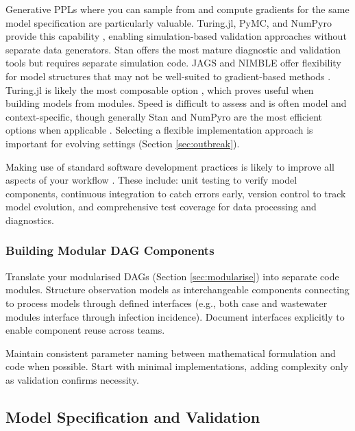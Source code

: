 \documentclass{article}
\begin{document}
Generative PPLs where you can sample from and compute gradients for the same model specification are particularly valuable.
Turing.jl, PyMC, and NumPyro provide this capability \citep{ge2018turing,fjelde2025turing,abril2023pymc,phan2019composable}, enabling simulation-based validation approaches without separate data generators.
Stan offers the most mature diagnostic and validation tools \citep{carpenter2017stan} but requires separate simulation code.
JAGS and NIMBLE offer flexibility for model structures that may not be well-suited to gradient-based methods \citep{plummer2003jags,valpine2017programming}.
Turing.jl is likely the most composable option \citep{ge2018turing}, which proves useful when building models from modules.
Speed is difficult to assess and is often model and context-specific, though generally Stan and NumPyro are the most efficient options when applicable \citep{carpenter2017stan,phan2019composable}.
Selecting a flexible implementation approach is important for evolving settings (Section \ref{sec:outbreak}).

Making use of standard software development practices is likely to improve all aspects of your workflow \citep{gelman2020bayesian}.
These include: unit testing to verify model components, continuous integration to catch errors early, version control to track model evolution, and comprehensive test coverage for data processing and diagnostics.

\subsubsection{Building Modular DAG Components}

Translate your modularised DAGs (Section \ref{sec:modularise}) into separate code modules.
Structure observation models as interchangeable components connecting to process models through defined interfaces (e.g., both case and wastewater modules interface through infection incidence).
Document interfaces explicitly to enable component reuse across teams.

Maintain consistent parameter naming between mathematical formulation and code when possible.
Start with minimal implementations, adding complexity only as validation confirms necessity.

\subsection{Model Specification and Validation}\label{sec:spec-validate}
\end{document}
